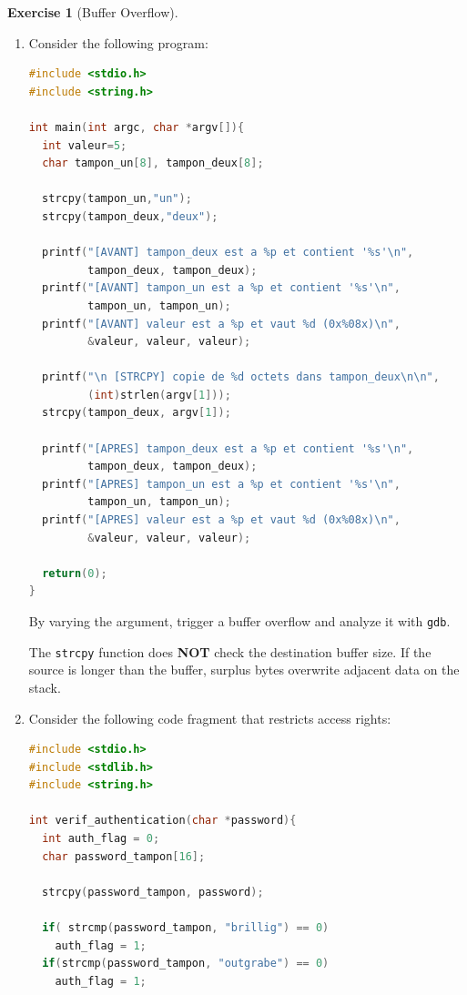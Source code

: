 \documentclass[a4paper,11pt]{article}
\theoremstyle{plain}
\theoremstyle{definition}
\newtheorem{exercice}{Exercise}
\begin{document}
\begin{exercice}[Buffer Overflow]
\begin{enumerate}
\item
Consider the following program:
\begin{lstlisting}[language=C]
#include <stdio.h>
#include <string.h>

int main(int argc, char *argv[]){
  int valeur=5;
  char tampon_un[8], tampon_deux[8];

  strcpy(tampon_un,"un");
  strcpy(tampon_deux,"deux");

  printf("[AVANT] tampon_deux est a %p et contient '%s'\n",
         tampon_deux, tampon_deux);
  printf("[AVANT] tampon_un est a %p et contient '%s'\n",
         tampon_un, tampon_un);
  printf("[AVANT] valeur est a %p et vaut %d (0x%08x)\n",
         &valeur, valeur, valeur);

  printf("\n [STRCPY] copie de %d octets dans tampon_deux\n\n",
         (int)strlen(argv[1]));
  strcpy(tampon_deux, argv[1]);

  printf("[APRES] tampon_deux est a %p et contient '%s'\n",
         tampon_deux, tampon_deux);
  printf("[APRES] tampon_un est a %p et contient '%s'\n",
         tampon_un, tampon_un);
  printf("[APRES] valeur est a %p et vaut %d (0x%08x)\n",
         &valeur, valeur, valeur);

  return(0);
}
\end{lstlisting}

By varying the argument, trigger a buffer overflow and analyze it with \texttt{gdb}.

\begin{pointcle}
The \texttt{strcpy} function does \textbf{NOT} check the destination buffer size. If the source is longer than the buffer, surplus bytes overwrite adjacent data on the stack.
\end{pointcle}

\item Consider the following code fragment that restricts access rights:

\begin{lstlisting}[language=C]
#include <stdio.h>
#include <stdlib.h>
#include <string.h>

int verif_authentication(char *password){
  int auth_flag = 0;
  char password_tampon[16];

  strcpy(password_tampon, password);

  if( strcmp(password_tampon, "brillig") == 0)
    auth_flag = 1;
  if(strcmp(password_tampon, "outgrabe") == 0)
    auth_flag = 1;


\end{lstlisting}
\end{enumerate}
\end{exercice}
\end{document}

